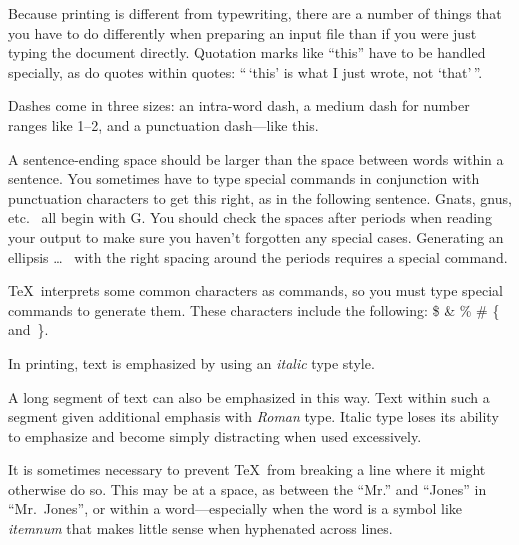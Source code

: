 \documentclass{river-journal}
\begin{document}
Because printing is different from typewriting, there are a
number of things that you have to do differently when preparing
an input file than if you were just typing the document directly.
Quotation marks like
       ``this''
have to be handled specially, as do quotes within quotes:
       ``\,`this'                  %
    is what I just
    wrote, not  `that'\,''.

Dashes come in three sizes: an
       intra-word
dash, a medium dash for number ranges like
       1--2,
and a punctuation
       dash---like
this.

A sentence-ending space should be larger than the space between words
within a sentence.  You sometimes have to type special commands in
conjunction with punctuation characters to get this right, as in the
following sentence.
       Gnats, gnus, etc.\    %
       all begin with G\@.   %
You should check the spaces after periods when reading your output to
make sure you haven't forgotten any special cases.
Generating an ellipsis
       \ldots\    %
with the right spacing around the periods
requires a special  command.

\TeX\ interprets some common characters as commands, so you must type
special commands to generate them.  These characters include the
following:
       \$ \& \% \# \{ and~\}.

In printing, text is emphasized by using an
       {\em italic\/}  %
type style.

\begin{em}
   A long segment of text can also be emphasized in this way.  Text within
   such a segment given additional emphasis
      with\/ {\em Roman}
   type.  Italic type loses its ability to emphasize and become simply
   distracting when used excessively.
\end{em}

It is sometimes necessary to prevent \TeX\ from breaking a line where
it might otherwise do so.  This may be at a space, as between the
``Mr.'' and ``Jones'' in
       ``Mr.~Jones'',        %
or within a word---especially when the word is a symbol like
       \mbox{\em itemnum\/}
that makes little sense when hyphenated across
       lines.
\end{document}
